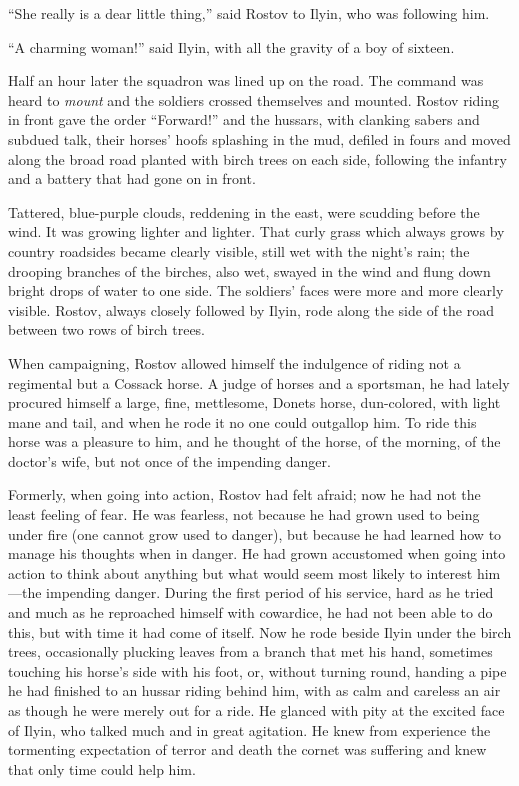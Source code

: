 ``She really is a dear little thing,'' said Rostov to Ilyin, who
was following him.

``A charming woman!'' said Ilyin, with all the gravity of a boy
of sixteen.

Half an hour later the squadron was lined up on the road. The
command was heard to \emph{mount} and the soldiers crossed
themselves and mounted.  Rostov riding in front gave the order
``Forward!'' and the hussars, with clanking sabers and subdued
talk, their horses' hoofs splashing in the mud, defiled in fours
and moved along the broad road planted with birch trees on each
side, following the infantry and a battery that had gone on in
front.

Tattered, blue-purple clouds, reddening in the east, were
scudding before the wind. It was growing lighter and
lighter. That curly grass which always grows by country roadsides
became clearly visible, still wet with the night's rain; the
drooping branches of the birches, also wet, swayed in the wind
and flung down bright drops of water to one side. The soldiers'
faces were more and more clearly visible. Rostov, always closely
followed by Ilyin, rode along the side of the road between two
rows of birch trees.

When campaigning, Rostov allowed himself the indulgence of riding
not a regimental but a Cossack horse. A judge of horses and a
sportsman, he had lately procured himself a large, fine,
mettlesome, Donets horse, dun-colored, with light mane and tail,
and when he rode it no one could outgallop him. To ride this
horse was a pleasure to him, and he thought of the horse, of the
morning, of the doctor's wife, but not once of the impending
danger.

Formerly, when going into action, Rostov had felt afraid; now he
had not the least feeling of fear. He was fearless, not because
he had grown used to being under fire (one cannot grow used to
danger), but because he had learned how to manage his thoughts
when in danger. He had grown accustomed when going into action to
think about anything but what would seem most likely to interest
him---the impending danger. During the first period of his
service, hard as he tried and much as he reproached himself with
cowardice, he had not been able to do this, but with time it had
come of itself. Now he rode beside Ilyin under the birch trees,
occasionally plucking leaves from a branch that met his hand,
sometimes touching his horse's side with his foot, or, without
turning round, handing a pipe he had finished to an hussar riding
behind him, with as calm and careless an air as though he were
merely out for a ride. He glanced with pity at the excited face
of Ilyin, who talked much and in great agitation. He knew from
experience the tormenting expectation of terror and death the
cornet was suffering and knew that only time could help him.

